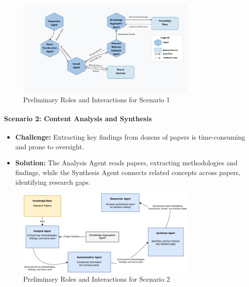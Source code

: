 \documentclass[11pt,a4paper]{article}
\begin{document}
\begin{figure}[H]
    \centering
    \includegraphics[width=0.8\textwidth]{images/preliminary-roles-scenario1.png}
    \caption{Preliminary Roles and Interactions for Scenario 1}
    \label{fig:scenario1}
\end{figure}

\paragraph{Scenario 2: Content Analysis and Synthesis}
\begin{itemize}
    \item \textbf{Challenge:} Extracting key findings from dozens of papers is time-consuming and prone to oversight.
    \item \textbf{Solution:} The Analysis Agent reads papers, extracting methodologies and findings, while the Synthesis Agent connects related concepts across papers, identifying research gaps.
\end{itemize}

\begin{figure}[H]
    \centering
    \includegraphics[width=0.8\textwidth]{images/preliminary-roles-scenario2.png}
    \caption{Preliminary Roles and Interactions for Scenario 2}
    \label{fig:scenario2}
\end{figure}

\end{document}
